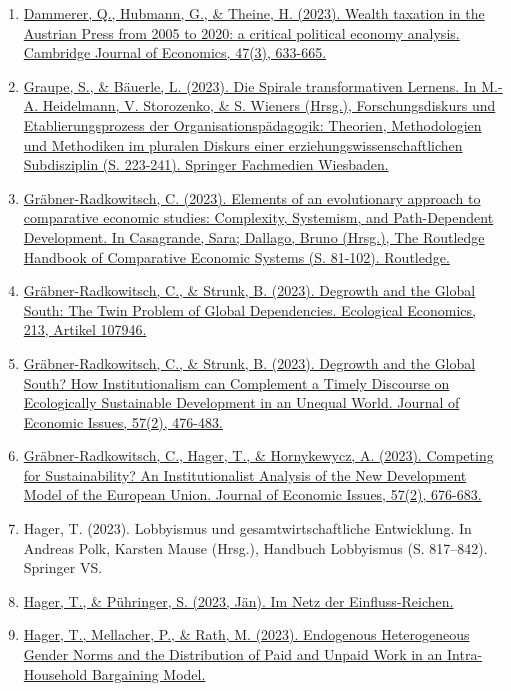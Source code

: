 \begin{enumerate}
	 \item \href{https://doi.org/10.1093/cje/bead011}{Dammerer, Q., Hubmann, G., \& Theine, H. (2023). Wealth taxation in the Austrian Press from 2005 to 2020: a critical political economy analysis. Cambridge Journal of Economics, 47(3), 633-665.}
	 \item \href{https://doi.org/10.1007/978-3-658-40997-5_15}{Graupe, S., \& Bäuerle, L. (2023). Die Spirale transformativen Lernens. In M.-A. Heidelmann, V. Storozenko, \& S. Wieners (Hrsg.), Forschungsdiskurs und Etablierungsprozess der Organisationspädagogik: Theorien, Methodologien und Methodiken im pluralen Diskurs einer erziehungswissenschaftlichen Subdisziplin (S. 223-241). Springer Fachmedien Wiesbaden.}
	 \item \href{https://doi.org/10.4324/9781003144366-6}{Gräbner-Radkowitsch, C. (2023). Elements of an evolutionary approach to comparative economic studies: Complexity, Systemism, and Path-Dependent Development. In Casagrande, Sara; Dallago, Bruno (Hrsg.), The Routledge Handbook of Comparative Economic Systems (S. 81-102). Routledge.}
	 \item \href{https://doi.org/10.1016/j.ecolecon.2023.107946}{Gräbner-Radkowitsch, C., \& Strunk, B. (2023). Degrowth and the Global South: The Twin Problem of Global Dependencies. Ecological Economics, 213, Artikel 107946.}
	 \item \href{https://doi.org/10.1080/00213624.2023.2201640}{Gräbner-Radkowitsch, C., \& Strunk, B. (2023). Degrowth and the Global South? How Institutionalism can Complement a Timely Discourse on Ecologically Sustainable Development in an Unequal World. Journal of Economic Issues, 57(2), 476-483.}
	 \item \href{https://doi.org/10.1080/00213624.2023.2203637}{Gräbner-Radkowitsch, C., Hager, T., \& Hornykewycz, A. (2023). Competing for Sustainability? An Institutionalist Analysis of the New Development Model of the European Union. Journal of Economic Issues, 57(2), 676-683.}
	 \item Hager, T. (2023). Lobbyismus und gesamtwirtschaftliche Entwicklung. In Andreas Polk, Karsten Mause (Hrsg.), Handbuch Lobbyismus (S. 817–842). Springer VS.
	 \item \href{https://www.arbeit-wirtschaft.at/milliardaerinnen-neoliberale-thinktanks/}{Hager, T., \& Pühringer, S. (2023, Jän). Im Netz der Einfluss-Reichen.}
	 \item \href{https://static.uni-graz.at/fileadmin/_files/_sowi_sites/_schumpeter-centre/GSC_Discussion_papers/30_Discussionpaper_geder_bargaining.pdf}{Hager, T., Mellacher, P., \& Rath, M. (2023). Endogenous Heterogeneous Gender Norms and the Distribution of Paid and Unpaid Work in an Intra-Household Bargaining Model.}

\end{enumerate}
